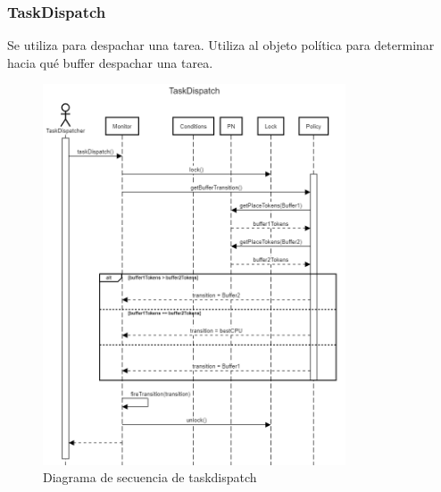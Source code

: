 \documentclass[a4paper,11pt]{article}
\begin{document}
    \subsubsection{TaskDispatch}
    Se utiliza para despachar una tarea. Utiliza al objeto política para 
    determinar hacia qué buffer despachar una tarea.
    \begin{figure}[H]
        \centering
        \includegraphics[width=0.8\textwidth]{sequence_diag/exports/TaskDispatch.png}
        \caption{Diagrama de secuencia de taskdispatch}
        \label{fig:seq_taskdispatch}
    \end{figure}
\end{document}
